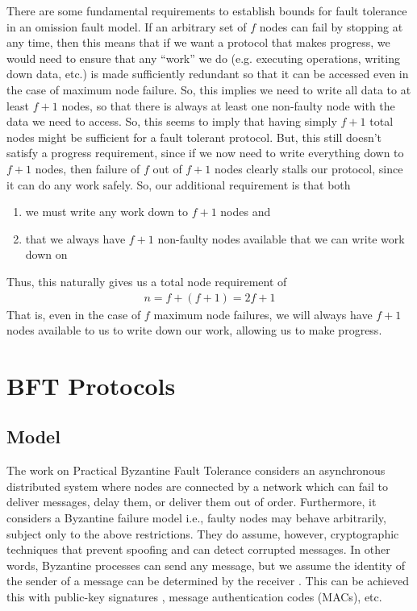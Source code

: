 \documentclass[10pt,a4paper]{article}
\begin{document}
There are some fundamental requirements to establish bounds for fault tolerance in an omission fault model. If an arbitrary set of $f$ nodes can fail by stopping at any time, then this means that if we want a protocol that makes progress, we would need to ensure that any ``work'' we do (e.g. executing operations, writing down data, etc.) is made sufficiently redundant so that it can be accessed even in the case of maximum node failure. So, this implies we need to write all data to at least $f+1$ nodes, so that there is always at least one non-faulty node with the data we need to access. So, this seems to imply that having simply $f+1$ total nodes might be sufficient for a fault tolerant protocol. But, this still doesn't satisfy a progress requirement, since if we now need to write everything down to $f+1$ nodes, then failure of $f$ out of $f+1$ nodes clearly stalls our protocol, since it can do any work safely. So, our additional requirement is that both 
\begin{enumerate}[1)]
    \item we must write any work down to $f+1$ nodes and
    \item  that we always have $f+1$ non-faulty nodes available that we can write work down on
\end{enumerate}
Thus, this naturally gives us a total node requirement of 
\begin{align*}
    n = f + (f+1) = 2f + 1
\end{align*}
That is, even in the case of $f$ maximum node failures, we will always have $f+1$ nodes available to us to write down our work, allowing us to make progress.


\section*{BFT Protocols}

\subsection*{Model}

The work on Practical Byzantine Fault Tolerance \cite{1999castropbft} considers an asynchronous distributed system where nodes are connected by a network which can fail to deliver messages, delay them, or deliver them out of order. Furthermore, it considers a Byzantine failure model i.e., faulty nodes may behave arbitrarily, subject only to the above restrictions. They do assume, however, cryptographic techniques that prevent spoofing and can detect corrupted messages. In other words, Byzantine processes can send any message, but we assume the identity of the sender of a message can be determined by the receiver \cite{2011lamport}. This can be achieved this with public-key signatures \cite{1978rivestcrypto}, message authentication codes (MACs), etc.
\end{document}
